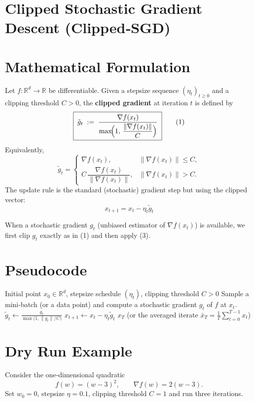 \documentclass{article}
\newcommand{\R}{\mathbb{R}}
\begin{document}
\section*{Clipped Stochastic Gradient Descent (Clipped‑SGD)}

\section*{Mathematical Formulation}
Let $f:\R^{d}\rightarrow\R$ be differentiable.  
Given a stepsize sequence $(\eta_t)_{t\ge 0}$ and a clipping threshold $C>0$, the
\textbf{clipped gradient} at iteration $t$ is defined by
\[
\boxed{\;
\tilde g_t \;:=\; 
\frac{\nabla f(x_t)}{\displaystyle \max\!\Bigl(1,\,
\frac{\|\nabla f(x_t)\|}{C}\Bigr)} 
\;}
\tag{1}
\]
Equivalently,
\[
\tilde g_t=
\begin{cases}
\nabla f(x_t), & \|\nabla f(x_t)\|\le C,\\[4pt]
C\,\dfrac{\nabla f(x_t)}{\|\nabla f(x_t)\|}, & \|\nabla f(x_t)\|> C .
\end{cases}
\tag{2}
\]
The update rule is the standard (stochastic) gradient step but using the
clipped vector:
\[
\boxed{\; x_{t+1}=x_t-\eta_t \tilde g_t \;}
\tag{3}
\]

When a stochastic gradient $g_t$ (unbiased estimator of $\nabla f(x_t)$) is
available, we first clip $g_t$ exactly as in (1) and then apply (3).

\section*{Pseudocode}
\begin{algorithm}[H]
\caption{Clipped‑SGD}
\begin{algorithmic}[1]
\Require Initial point $x_0\in\R^d$, stepsize schedule $(\eta_t)$, clipping threshold $C>0$
    \State Sample a mini‑batch (or a data point) and compute a stochastic gradient $g_t$ of $f$ at $x_t$.
    \State $\displaystyle \tilde g_t \gets \frac{g_t}{\max\!\bigl(1,\|g_t\|/C\bigr)}$ 
    \State $x_{t+1}\gets x_t-\eta_t \tilde g_t$ 
\EndFor
\State \Return $x_T$ (or the averaged iterate $\bar x_T=\frac1T\sum_{t=0}^{T-1}x_t$)
\end{algorithmic}
\end{algorithm}

\section*{Dry Run Example}
Consider the one‑dimensional quadratic
\[
f(w)=(w-3)^2,\qquad \nabla f(w)=2(w-3).
\]
Set $w_0=0$, stepsize $\eta=0.1$, clipping threshold $C=1$ and run three
iterations.
\end{document}
